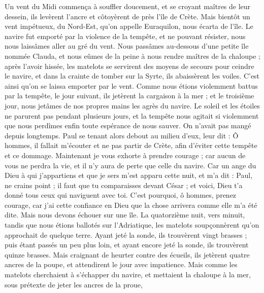 \begin{multicols}{2}
Un vent du Midi commença à souffler doucement, et se croyant maîtres de leur dessein, ils levèrent l’ancre et côtoyèrent de près l’île de Crète.
\TextTitle{[La tempête]}
Mais bientôt un vent impétueux, du Nord-Est, qu'on appelle Euraquilon, nous écarta de l'île.
Le navire fut emporté par la violence de la tempête, et ne pouvant résister, nous nous laissâmes aller au gré du vent.
Nous passâmes au-dessous d’une petite île nommée Clauda, et nous eûmes de la peine à nous rendre maîtres de la chaloupe ;
après l’avoir hissée, les matelots se servirent des moyens de secours pour ceindre le navire, et dans la crainte de tomber sur la Syrte, ils abaissèrent les voiles. C’est ainsi qu’on se laissa emporter par le vent.
Comme nous étions violemment battus par la tempête, le jour suivant, ils jetèrent la cargaison à la mer ;
et le troisième jour, nous jetâmes de nos propres mains les agrès du navire.
Le soleil et les étoiles ne parurent pas pendant plusieurs jours, et la tempête nous agitait si violemment que nous perdîmes enfin toute espérance de nous sauver.
On n’avait pas mangé depuis longtemps. Paul se tenant alors debout au milieu d'eux, leur dit : Ô hommes, il fallait m’écouter et ne pas partir de Crète, afin d’éviter cette tempête et ce dommage.
Maintenant je vous exhorte à prendre courage ; car aucun de vous ne perdra la vie, et il n’y aura de perte que celle du navire.
Car un ange du Dieu à qui j’appartiens et que je sers m’est apparu cette nuit,
et m’a dit : Paul, ne crains point ; il faut que tu comparaisses devant César ; et voici, Dieu t'a donné tous ceux qui naviguent avec toi.
C'est pourquoi, ô hommes, prenez courage, car j'ai cette confiance en Dieu que la chose arrivera comme elle m'a été dite.
Mais nous devons échouer sur une île.
La quatorzième nuit, vers minuit, tandis que nous étions ballotés sur l’Adriatique, les matelots soupçonnèrent qu’on approchait de quelque terre.
Ayant jeté la sonde, ils trouvèrent vingt brasses ; puis étant passés un peu plus loin, et ayant encore jeté la sonde, ils trouvèrent quinze brasses.
Mais craignant de heurter contre des écueils, ils jetèrent quatre ancres de la poupe, et attendirent le jour avec impatience.
Mais comme les matelots cherchaient à s’échapper du navire, et mettaient la chaloupe à la mer, sous prétexte de jeter les ancres de la proue,

\end{multicols}

